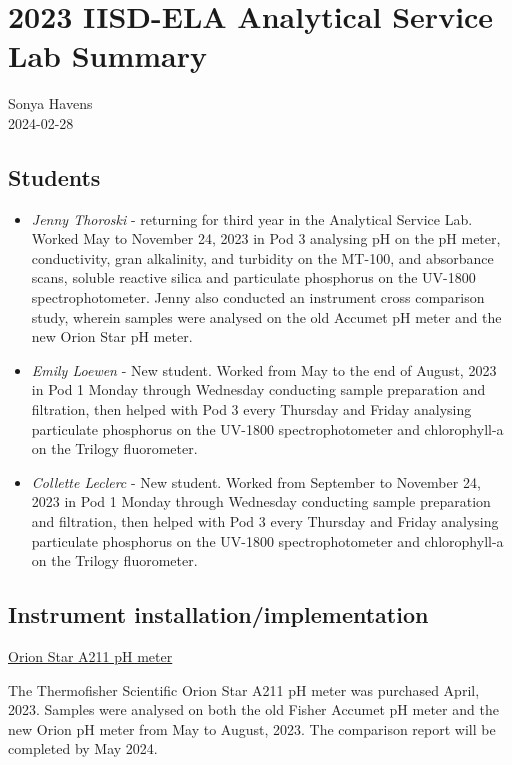 \documentclass[
]{article}
\author{}
\date{\vspace{-2.5em}}
\begin{document}
\hypertarget{iisd-ela-analytical-service-lab-summary}{%
\section{2023 IISD-ELA Analytical Service Lab
Summary}\label{iisd-ela-analytical-service-lab-summary}}

Sonya Havens\\
2024-02-28

\hypertarget{students}{%
\subsection{Students}\label{students}}

\begin{itemize}
\item
  \emph{Jenny Thoroski} - returning for third year in the Analytical
  Service Lab. Worked May to November 24, 2023 in Pod 3 analysing pH on
  the pH meter, conductivity, gran alkalinity, and turbidity on the
  MT-100, and absorbance scans, soluble reactive silica and particulate
  phosphorus on the UV-1800 spectrophotometer. Jenny also conducted an
  instrument cross comparison study, wherein samples were analysed on
  the old Accumet pH meter and the new Orion Star pH meter.
\item
  \emph{Emily Loewen} - New student. Worked from May to the end of
  August, 2023 in Pod 1 Monday through Wednesday conducting sample
  preparation and filtration, then helped with Pod 3 every Thursday and
  Friday analysing particulate phosphorus on the UV-1800
  spectrophotometer and chlorophyll-a on the Trilogy fluorometer.
\item
  \emph{Collette Leclerc} - New student. Worked from September to
  November 24, 2023 in Pod 1 Monday through Wednesday conducting sample
  preparation and filtration, then helped with Pod 3 every Thursday and
  Friday analysing particulate phosphorus on the UV-1800
  spectrophotometer and chlorophyll-a on the Trilogy fluorometer.
\end{itemize}

\hypertarget{instrument-installationimplementation}{%
\subsection{Instrument
installation/implementation}\label{instrument-installationimplementation}}

\underline{Orion Star A211 pH meter}

The Thermofisher Scientific Orion Star A211 pH meter was purchased
April, 2023. Samples were analysed on both the old Fisher Accumet pH
meter and the new Orion pH meter from May to August, 2023. The
comparison report will be completed by May 2024.
\end{document}
